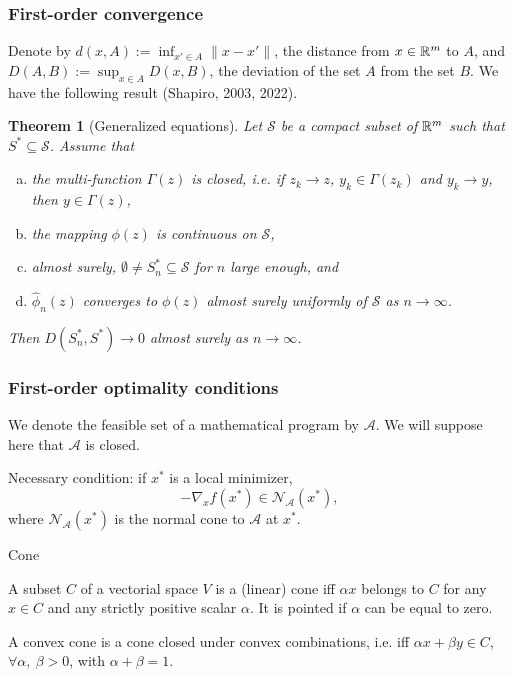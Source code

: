 \documentclass{beamer}
\newtheorem{theo}{Theorem}
\newcommand{\tim}[1]{\;\; \mbox{#1} \;\;}
\begin{document}
\begin{frame}
\frametitle{First-order convergence}

Denote by $d(x,A) := \inf_{x' \in A} \| x - x' \|$, the distance from $x \in \mathbb{R}^m$ to $A$, and $D(A,B) := \sup_{x \in A} D(x, B)$, the deviation of the set $A$ from the set $B$.
We have the following result (Shapiro, 2003, 2022).
\begin{theo}[Generalized equations]
Let $\mathcal{S}$ be a compact subset of $\mathbb{R}^m$ such that $S^* \subseteq \mathcal{S}$.
Assume that
\begin{enumerate}[(a)]
\item
the multi-function $\Gamma(z)$ is closed, i.e. if $z_k \rightarrow z$, $y_k \in \Gamma(z_k)$ and $y_k \rightarrow y$, then $y \in \Gamma(z)$,
\item
the mapping $\phi(z)$ is continuous on $\mathcal{S}$,
\item 
almost surely, $\emptyset \neq S^*_n \subseteq \mathcal{S}$ for $n$ large enough, and
\item
$\hat{\phi}_n(z)$ converges to $\phi(z)$ almost surely uniformly of $\mathcal{S}$ as $n \rightarrow \infty$.
\end{enumerate}
Then $D(S^*_n, S^*) \rightarrow 0$ almost surely as $n \rightarrow \infty$.
\label{th:svi}
\end{theo}

\end{frame}

\begin{frame}
\frametitle{First-order optimality conditions}

We denote the feasible set of a mathematical program by $\mathcal{A}$.
We will suppose here that $\mathcal{A}$ is closed.

\mbox{}

{\red Necessary condition}: if $x^*$ is a local minimizer,
\[
-\nabla_x f(x^*) \in \mathcal{N}_{\mathcal{A}}(x^*),
\]
where $\mathcal{N}_{\mathcal{A}}(x^*)$ is the normal cone to $\mathcal{A}$ at $x^*$.

\mbox{}

{\blue Cone}

\mbox
 
A subset $C$ of a vectorial space $V$ is a (linear) {\red cone}
iff $\alpha x$ belongs to $C$ for any $x \in C$ and any strictly positive scalar $\alpha$.
It is pointed if $\alpha$ can be equal to zero.

\mbox{}

A {\red convex cone} is a cone closed under convex combinations, i.e. iff $\alpha x + \beta y \in C$, $\forall \alpha,\ \beta > 0$, with $\alpha + \beta = 1$.

\end{frame}
\end{document}
